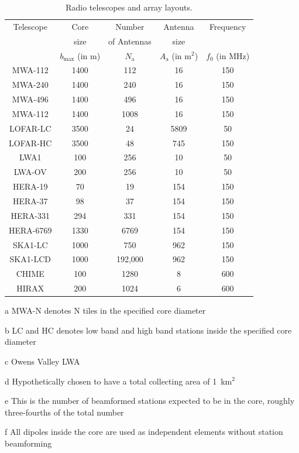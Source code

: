 \documentclass[a4paper,fleqn,usenatbib]{../mnras}
\begin{document}
\begin{table}
  \centering
  \caption{Radio telescopes and array layouts.}
  \label{tab:antenna-layouts}
  \begin{threeparttable}
  \begin{tabular}{ccccc} 
    \hline
    Telescope & Core & Number & Antenna & Frequency \\
              & size & of Antennas & size & \\
              & $b_\textrm{max}$ (in m) & $N_\textrm{a}$ & $A_\textrm{a}$ (in m$^2$) & $f_0$ (in MHz) \\
    \hline
    MWA-112\tnote{a} & 1400 & 112 & 16 & 150 \\
    MWA-240\tnote{a} & 1400 & 240 & 16 & 150 \\
    MWA-496\tnote{a} & 1400 & 496 & 16 & 150 \\
    MWA-112\tnote{a} & 1400 & 1008 & 16 & 150 \\
    LOFAR-LC\tnote{b} & 3500 & 24 & 5809 & 50 \\
    LOFAR-HC\tnote{b} & 3500 & 48 & 745 & 150 \\
    LWA1 & 100 & 256 & 10 & 50 \\
    LWA-OV\tnote{c} & 200 & 256 & 10 & 50 \\
    HERA-19 & 70 & 19 & 154 & 150 \\
    HERA-37 & 98 & 37 & 154 & 150 \\
    HERA-331 & 294 & 331 & 154 & 150 \\
    HERA-6769\tnote{d} & 1330 & 6769 & 154 & 150 \\
    SKA1-LC\tnote{e} & 1000 & 750 & 962 & 150 \\
    SKA1-LCD\tnote{f} & 1000 & 192,000 & 962 & 150 \\
    CHIME & 100 & 1280 & 8 & 600 \\
    HIRAX & 200 & 1024 & 6 & 600 \\
    \hline
  \end{tabular}
  \begin{tablenotes}
    \item[a] MWA-N denotes N tiles in the specified core diameter
    \item[b] LC and HC denotes low band and high band stations inside the 
      specified core diameter 
    \item[c] Owens Valley LWA
    \item[d] Hypothetically chosen to have a total collecting area of 
      1~km$^2$
    \item[e] This is the number of beamformed stations expected to be in the 
      core, roughly three-fourths of the total number
    \item[f] All dipoles inside the core are used as independent elements 
      without station beamforming
  \end{tablenotes}
  \end{threeparttable}
\end{table}
\end{document}
